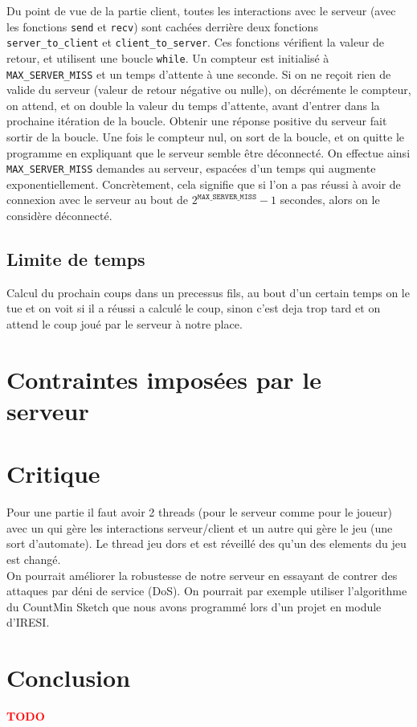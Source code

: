 \documentclass[a4paper]{article}
\newcommand{\TODO}{\textcolor{red}{\textbf{TODO}}}
\begin{document}
Du point de vue de la partie client, toutes les interactions avec le serveur 
(avec les fonctions \texttt{send} et \texttt{recv}) sont cachées derrière deux 
fonctions \texttt{server\_to\_client} et \texttt{client\_to\_server}. Ces 
fonctions vérifient la valeur de retour, et utilisent une boucle 
\texttt{while}. Un compteur est initialisé à \texttt{MAX\_SERVER\_MISS} et un 
temps d'attente à une seconde. Si on ne reçoit rien de valide du serveur 
(valeur de retour négative ou nulle), on décrémente le compteur, on attend, et 
on double la valeur du temps d'attente, avant d'entrer dans la prochaine 
itération de la boucle. Obtenir une réponse positive du serveur fait sortir de 
la boucle. Une fois le compteur nul, on sort de la boucle, et on quitte le 
programme en expliquant que le serveur semble être déconnecté. On effectue 
ainsi \texttt{MAX\_SERVER\_MISS} demandes au serveur, espacées d'un temps qui 
augmente exponentiellement. Concrètement, cela signifie que si l'on a pas 
réussi à avoir de connexion avec le serveur au bout de 
$2^{\texttt{MAX\_SERVER\_MISS}} - 1$ secondes, alors on le considère déconnecté.


\subsection{Limite de temps}

Calcul du prochain coups dans un precessus fils, au bout d'un certain temps on 
le tue et on voit si il a réussi a calculé le coup, sinon c'est deja trop tard 
et on attend le coup joué par le serveur à notre place.


\section{Contraintes imposées par le serveur}



\section{Critique}

Pour une partie il faut avoir 2 threads (pour le serveur comme pour le joueur) 
avec un qui gère les interactions serveur/client et un autre qui gère le jeu 
(une sort d'automate). Le thread jeu dors et est réveillé des qu'un des 
elements du jeu est changé. \\


On pourrait améliorer la robustesse de notre serveur en essayant de contrer des attaques par déni de service (DoS). On pourrait par exemple utiliser l'algorithme du CountMin Sketch que nous avons programmé lors d'un projet en module d'IRESI. \\


\section*{Conclusion}

\TODO


 

\end{document}
